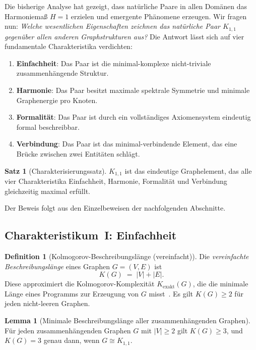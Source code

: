﻿\documentclass[a4paper,12pt]{article}
\theoremstyle{definition}
\newtheorem{definition}{Definition}
\newtheorem{satz}{Satz}
\newtheorem{lemma}{Lemma}
\begin{document}
Die bisherige Analyse hat gezeigt, dass natürliche Paare in allen Domänen das
Harmoniemaß $H = 1$ erzielen und emergente Phänomene erzeugen.
Wir fragen nun: \emph{Welche wesentlichen Eigenschaften zeichnen das natürliche
Paar $K_{1,1}$ gegenüber allen anderen Graphstrukturen aus?}
Die Antwort lässt sich auf vier fundamentale Charakteristika verdichten:
\begin{enumerate}
	\item \textbf{Einfachheit}: Das Paar ist die minimal-komplexe nicht-triviale
	zusammenhängende Struktur.
	\item \textbf{Harmonie}: Das Paar besitzt maximale spektrale Symmetrie und
	minimale Graphenergie pro Knoten.
	\item \textbf{Formalität}: Das Paar ist durch ein vollständiges Axiomensystem
	eindeutig formal beschreibbar.
	\item \textbf{Verbindung}: Das Paar ist das minimal-verbindende Element,
	das eine Brücke zwischen zwei Entitäten schlägt.
\end{enumerate}

\begin{satz}[Charakterisierungssatz]
	\label{satz:charakt}
	$K_{1,1}$ ist das eindeutige Graphelement, das alle vier Charakteristika
	Einfachheit, Harmonie, Formalität und Verbindung gleichzeitig maximal erfüllt.
\end{satz}

Der Beweis folgt aus den Einzelbeweisen der nachfolgenden Abschnitte.

\subsection{Charakteristikum~I: Einfachheit}
\label{subsec:einfachheit}

\begin{definition}[Kolmogorov-Beschreibungslänge (vereinfacht)]
	\label{def:kolmogorov}
	Die \emph{vereinfachte Beschreibungslänge} eines Graphen $G = (V, E)$ ist
	\[
		K(G) \;=\; |V| + |E|.
	\]
	Diese approximiert die Kolmogorov-Komplexität $K_{\mathrm{exakt}}(G)$,
	die die minimale Länge eines Programms zur Erzeugung von $G$ misst~\cite{kolmogorov1965}.
	Es gilt $K(G) \geq 2$ für jeden nicht-leeren Graphen.
\end{definition}

\begin{lemma}[Minimale Beschreibungslänge aller zusammenhängenden Graphen]
	\label{lem:minK}
	Für jeden zusammenhängenden Graphen $G$ mit $|V| \geq 2$ gilt
	$K(G) \geq 3$, und $K(G) = 3$ genau dann, wenn $G \cong K_{1,1}$.
\end{lemma}
\end{document}
